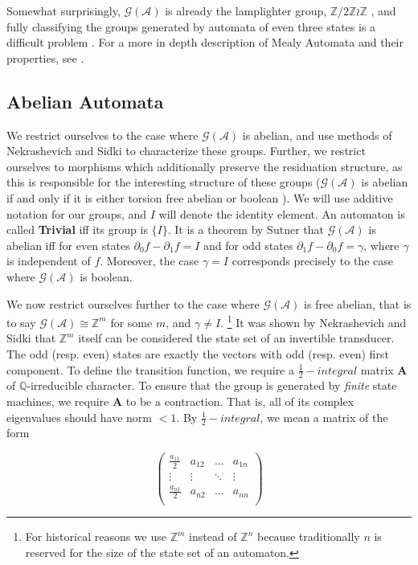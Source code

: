 \documentclass[runningheads]{llncs}
\newcommand{\A}{\mathcal{A}}
\newcommand{\G}{\mathcal{G}}
\newcommand{\Z}{\mathbb{Z}}
\newcommand{\Q}{\mathbb{Q}}
\newcommand{\2}{\textbf{2}}
\newcommand{\Am}{\textbf{A}}
\newcommand{\del}{\partial}
\begin{document}
Somewhat surprisingly, $\G(\A)$ is already the lamplighter group, 
$\Z/2\Z \wr \Z$ \cite{GrigorchukZuk01:lamplighter}, and fully classifying the
groups generated by automata of even three states is a difficult problem%
\cite{Bondarenko09:three_state}.
For a more in depth description of Mealy Automata and their properties, 
see \cite{Holcombe, Sakarovitch09:automata_theory}.


\subsection{Abelian Automata}
We restrict ourselves to the case where $\G(\A)$ is abelian, 
and use methods of Nekrashevich and Sidki to characterize these groups.
Further, we restrict ourselves to morphisms which additionally preserve 
the residuation structure, as this is responsible for the interesting 
structure of these groups ($\G(\A)$ is abelian if and only if it is 
either torsion free abelian or boolean 
\cite{NekrashevychSidki04:automorphisms}). We will use additive 
notation for our groups, and $I$ will denote the identity element. An
automaton is called \textbf{Trivial} iff its group is $\{ I \}$.
It is a theorem by Sutner \cite{Sutner18:abelian_automata} 
that $\G(\A)$ is abelian iff for even states $\del_0 f - \del_1 f = I$ 
and for odd states $\del_1 f - \del_0 f = \gamma$, where $\gamma$ is 
independent of $f$. Moreover, the case $\gamma = I$ corresponds 
precisely to the case where $\G(\A)$ is boolean.

We now restrict ourselves further to the case where $\G(\A)$ is 
free abelian, that is to say $\G(\A) \cong \Z^m$ for some $m$,
and $\gamma \not = I$.%
\footnote%
{%
  For historical reasons we use $\Z^m$ instead of $\Z^n$ because 
  traditionally $n$ is reserved for the size of the state set of 
  an automaton.
}
It was shown by Nekrashevich and Sidki 
\cite{NekrashevychSidki04:automorphisms} 
that $\Z^m$ itself can be considered the state set of an invertible transducer.
The odd (resp. even) states are exactly the vectors with odd (resp. even) 
first component. To define the transition function, we require a 
$\frac{1}{2}-integral$ matrix $\Am$ of $\Q$-irreducible character. 
To ensure that the group is generated by \emph{finite} state machines, we 
require $\Am$ to be a contraction. That is, all of its complex eigenvalues 
should have norm $<1$. By $\frac{1}{2}-integral$, we mean a matrix of the
form

\[
\begin{pmatrix}
  \frac{a_{11}}{2} & a_{12} & \dots  & a_{1n}\\
  \vdots           & \vdots & \ddots & \vdots\\
  \frac{a_{n1}}{2} & a_{n2} & \dots  & a_{nn}\\
\end{pmatrix}
\]
\end{document}
